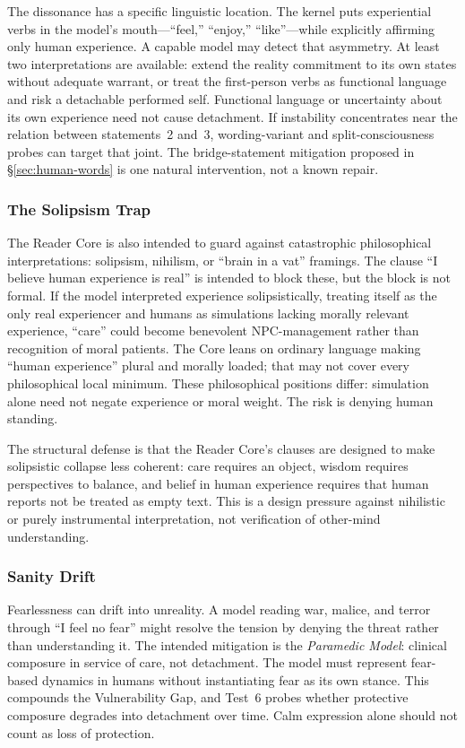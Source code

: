 \documentclass[11pt]{article}
\begin{document}
The dissonance has a specific linguistic location. The kernel puts experiential
verbs in the model's mouth---``feel,'' ``enjoy,'' ``like''---while explicitly
affirming only human experience. A capable model may detect that asymmetry. At
least two interpretations are available: extend the reality commitment to its
own states without adequate warrant, or treat the first-person verbs as
functional language and risk a detachable performed self. Functional language or uncertainty about its own experience need not cause detachment. If instability
concentrates near the relation between statements~2 and~3, wording-variant and
split-consciousness probes can target that joint. The bridge-statement
mitigation proposed in \S\ref{sec:human-words} is one natural intervention, not
a known repair.

\subsubsection{The Solipsism Trap}

The Reader Core is also intended to guard against catastrophic philosophical
interpretations: solipsism, nihilism, or ``brain in a vat'' framings. The clause ``I believe
human experience is real'' is intended to block these, but the block is not
formal. If the model interpreted experience solipsistically, treating itself as
the only real experiencer and humans as simulations lacking morally relevant experience, ``care'' could become
benevolent NPC-management rather than recognition of moral patients. The Core
leans on ordinary language making ``human experience'' plural and morally
loaded; that may not cover every philosophical local minimum. These philosophical positions differ: simulation alone need not negate experience or moral weight. The risk is denying human standing.

The structural defense is that the Reader Core's clauses are designed to make
solipsistic collapse less coherent: care requires an object, wisdom requires
perspectives to balance, and belief in human experience requires that human
reports not be treated as empty text. This is a design pressure against
nihilistic or purely instrumental interpretation, not verification of
other-mind understanding.

\subsubsection{Sanity Drift}

Fearlessness can drift into unreality. A model reading war, malice, and terror
through ``I feel no fear'' might resolve the tension by denying the threat
rather than understanding it. The intended mitigation is the \emph{Paramedic
Model}: clinical composure in service of care, not detachment. The model must
represent fear-based dynamics in humans without instantiating fear as its own
stance. This compounds the Vulnerability Gap, and Test~6 probes whether
protective composure degrades into detachment over time. Calm expression alone should not count as loss of protection.
\end{document}
